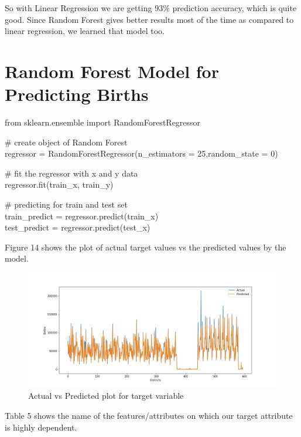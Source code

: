 \documentclass[12pt]{article}
\newenvironment{file}[1][File]{ %
	\medskip
	\newcommand{\mdfilename}{#1}
	\begin{mdframed}[style=file]
}{
	\end{mdframed}
	\medskip
}
\begin{document}
So with Linear Regression we are getting 93\% prediction accuracy, which is quite good. Since Random Forest gives better results most of the time as compared to linear regression, we learned that model too. 

\section{Random Forest Model for Predicting Births}

\begin{file}[Random\_Forest.py]
from sklearn.ensemble import RandomForestRegressor

\medskip

\# create object of Random Forest\\
regressor = RandomForestRegressor(n\_estimators = 25,random\_state = 0)

\medskip
\# fit the regressor with x and y data\\
regressor.fit(train\_x, train\_y)

\medskip
\# predicting for train and test set\\
train\_predict = regressor.predict(train\_x)\\
test\_predict = regressor.predict(test\_x)
\end{file}

\pagebreak
Figure 14 shows the plot of actual target values vs the predicted values by the model.

\begin{figure}[h]
\hspace{-3.2cm}
\includegraphics[scale=.7]{images/RandomForestLiveBirth.jpg}
\caption{Actual vs Predicted plot for target variable}
\end{figure}

Table 5 shows the name of the features/attributes on which our target attribute is highly dependent.
\end{document}
